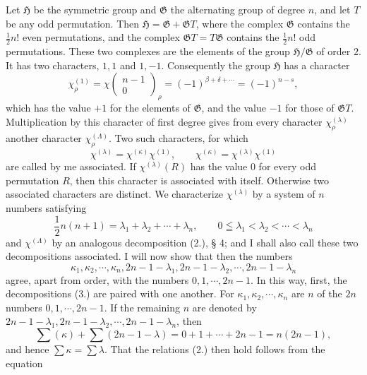 \documentclass[11pt]{article}
\newcommand{\Hgr}{\mathfrak{H}}
\newcommand{\Ggr}{\mathfrak{G}}
\begin{document}
Let $\Hgr$ be the symmetric group and $\Ggr$ the alternating group of degree $n$, and let $T$ be any odd permutation. Then $\Hgr=\Ggr+
\Ggr T$, where the complex $\Ggr$ contains the $\frac12n!$ even permutations, and the complex $\Ggr T=T\Ggr$ contains the $\frac12n!$ odd permutations. These two complexes are the elements of the group $\Hgr/\Ggr$ of order $2$. It has two characters, $1,1$ and $1,-1$. Consequently the group $\Hgr$ has a character
\begin{equation}\tag{1.}
 \chi_\rho^{(1)}=\chi\left(\begin{matrix}n-1\\0\end{matrix}\right)_\rho=(-1)^{\beta+
\delta+
\cdots}=(-1)^{n-s},
\end{equation}
which has the value $+1$ for the elements of $\Ggr$, and the value $-1$ for those of $\Ggr T$. Multiplication by this character of first degree gives from every character $\chi_\rho^{(\lambda)}$ another character $\chi_\rho^{(\Lambda)}$. Two such characters, for which
\begin{equation}\tag{2.}
 \chi^{(\lambda)}=\chi^{(\kappa)}\chi^{(1)},\qquad
 \chi^{(\kappa)}=\chi^{(\lambda)}\chi^{(1)}
\end{equation}
are called by me associated. If $\chi^{(\lambda)}(R)$ has the value $0$ for every odd permutation $R$, then this character is associated with itself. Otherwise two associated characters are distinct. We characterize $\chi^{(\lambda)}$ by a system of $n$ numbers satisfying
\begin{equation}\tag{3.}
 \frac12n(n+1)=\lambda_1+
\lambda_2+
\cdots+
\lambda_n,
\qquad 0\leqq\lambda_1<\lambda_2<\cdots<\lambda_n
\end{equation}
and $\chi^{(\Lambda)}$ by an analogous decomposition (2.), § 4; and I shall also call these two decompositions associated. I will now show that then the numbers
\begin{equation}\tag{4.}
 \kappa_1,
\kappa_2,
\cdots,
\kappa_n,
 2n-1-
\lambda_1,
 2n-1-
\lambda_2,
\cdots,
 2n-1-
\lambda_n
\end{equation}
agree, apart from order, with the numbers $0,1,\cdots,2n-1$. In this way, first, the decompositions (3.) are paired with one another. For $\kappa_1,
\kappa_2,
\cdots,
\kappa_n$ are $n$ of the $2n$ numbers $0,1,
\cdots,2n-1$. If the remaining $n$ are denoted by $2n-1-
\lambda_1,2n-1-
\lambda_2,
\cdots,2n-1-
\lambda_n$, then
\[
 \sum(\kappa)+
\sum(2n-1-
\lambda)=0+1+
\cdots+2n-1=n(2n-1),
\]
and hence $\sum\kappa=\sum\lambda$. That the relations (2.) then hold follows from the equation
\end{document}
